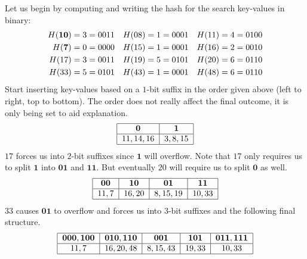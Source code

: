 \begin{solution}[\fullpage]
  Let us begin by computing and writing the hash for the search 
  key-values in binary:
  \begin{align}
    H(\mathbf{10}) &= 3 = 0011 \quad H(08) = 1 = 0001 \quad H(11) = 4 = 0100 \nonumber \\
    H(\mathbf{7}) &= 0 = 0000 \quad H(15) = 1 = 0001 \quad H(16) = 2 = 0010 \nonumber \\
    H(17) &= 3 = 0011 \quad H(19) = 5 = 0101 \quad H(20) = 6 = 0110 \nonumber \\
    H(33) &= 5 = 0101 \quad H(43) = 1 = 0001 \quad H(48) = 6 = 0110 \nonumber        
  \end{align}  
  Start inserting key-values based on a $1$-bit suffix in the order given
  above (left to right, top to bottom). The order does not really affect
  the final outcome, it is only being set to aid explanation. 
  \begin{align}
    \begin{tabular}{|c|c|}
      \hline
      $\mathbf{0}$ & $\mathbf{1}$ \\
      \hline
      $11,14,16$ & $3,8,15$ \\
      \hline
    \end{tabular}\nonumber
  \end{align}
  $17$ forces us into $2$-bit suffixes since $\mathbf{1}$ will overflow. 
  Note that $17$ only requires us to split $\mathbf{1}$ into $\mathbf{01}$ and
  $\mathbf{11}$. But eventually $20$ will require us to split $\mathbf{0}$ as
  well.
  \begin{align}
    \begin{tabular}{|c|c|c|c|}
      \hline
      $\mathbf{00}$ & $\mathbf{10}$ & $\mathbf{01}$ & $\mathbf{11}$ \\
      \hline 
      $11,\vb$ & $16,20$ & $8,15,19$ & $\va,33$ \\
      \hline
    \end{tabular}\nonumber  
  \end{align}
  $33$ causes $\mathbf{01}$ to overflow and forces us into $3$-bit suffixes
  and the following final structure.
  \begin{align}
    \begin{tabular}{|c|c|c|c|c|}
      \hline
      $\mathbf{000,100}$ & $\mathbf{010,110}$ & $\mathbf{001}$ & $\mathbf{101}$ & $\mathbf{011,111}$ \\
      \hline 
      $11,\vb$ & $16,20,48$ & $8,15,43$ & $19,33$ & $\va,33$ \\
      \hline
    \end{tabular}\nonumber
  \end{align}

\end{solution}
